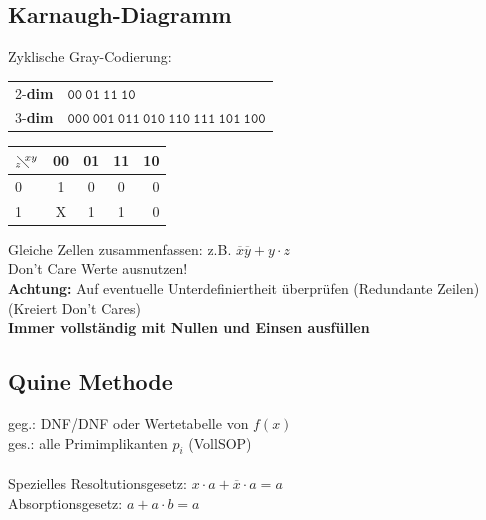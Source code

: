 \documentclass[6pt,a4paper]{scrartcl}
\renewcommand{\emph}[1]{\textsf{\textbf{#1}}}
\begin{document}
\begin{multicols*}{3}
	\subsection{Karnaugh-Diagramm} %
		Zyklische Gray-Codierung:
    \begin{tabular}{ r|l }
      2-\textbf{dim}& $\mathtt{00} ~ \mathtt{01} ~ \mathtt{11} ~ \mathtt{10}$ \\
      3-\textbf{dim}& $\mathtt{000} ~ \mathtt{001} ~ \mathtt{011} ~ \mathtt{010} ~ \mathtt{110} ~ \mathtt{111} ~ \mathtt{101} ~ \mathtt{100}$
    \end{tabular}

	\begin{tabular}{l | c | c |  c | r}
	$_z\!\!\diagdown \!\!^{xy}$ & 00 	& 	01	&	11 	&	10	 	\\ \midrule
	0		&	1 \cellcolor{gray}	&	0	&	0	&	0		\\
	1		&	X \cellcolor{gray}	&	1 \cellcolor{lightgray}	&	1 \cellcolor{lightgray}	&	0		\\
	\end{tabular}
	Gleiche Zellen zusammenfassen: z.B. $\overline x \overline y + y \cdot z$\\
	Don't Care Werte ausnutzen!\\
	\emph{Achtung:} Auf eventuelle Unterdefiniertheit überprüfen (Redundante Zeilen) (Kreiert Don't Cares)\\
	\emph{Immer vollständig mit Nullen und Einsen ausfüllen}

	\subsection{Quine Methode}
	geg.: DNF/DNF oder Wertetabelle von $f(x)$ \\
	ges.: alle Primimplikanten $p_i$ (VollSOP)  \\ \\
	Spezielles Resoltutionsgesetz: $x\cdot a + \overline x \cdot a = a$ \\
	Absorptionsgesetz: $a + a\cdot b = a$


\end{multicols*}
\end{document}
